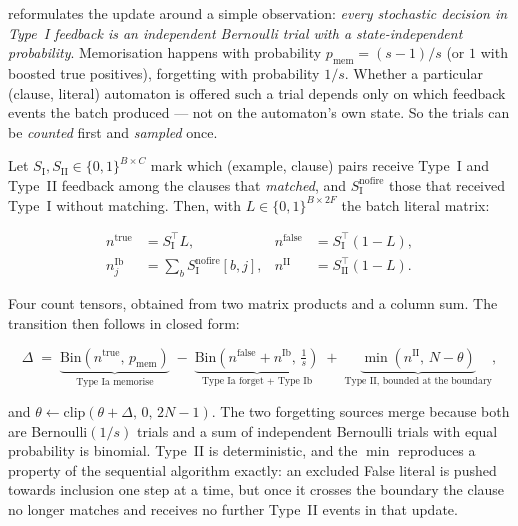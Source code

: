\ttlibname reformulates the update around a simple observation: \emph{every stochastic
decision in Type~I feedback is an independent Bernoulli trial with a state-independent
probability}. Memorisation happens with probability $p_{\text{mem}} = (s-1)/s$ (or $1$ with
boosted true positives), forgetting with probability $1/s$. Whether a particular
(clause, literal) automaton is offered such a trial depends only on which feedback events the
batch produced --- not on the automaton's own state. So the trials can be \emph{counted}
first and \emph{sampled} once.

Let $S_{\mathrm{I}}, S_{\mathrm{II}} \in \{0,1\}^{B\times C}$ mark which (example, clause)
pairs receive Type~I and Type~II feedback among the clauses that \emph{matched}, and
$S_{\mathrm{I}}^{\text{nofire}}$ those that received Type~I without matching. Then, with
$L \in \{0,1\}^{B\times 2F}$ the batch literal matrix:

\begin{align}
  n^{\text{true}} &= S_{\mathrm{I}}^{\!\top} L, &
  n^{\text{false}} &= S_{\mathrm{I}}^{\!\top} (1 - L), \\
  n^{\text{Ib}}_j &= \textstyle\sum_b S^{\text{nofire}}_{\mathrm{I}}[b,j], &
  n^{\text{II}} &= S_{\mathrm{II}}^{\!\top} (1 - L).
\end{align}

Four count tensors, obtained from two matrix products and a column sum. The transition then
follows in closed form:

\begin{equation}
  \Delta \;=\; \underbrace{\mathrm{Bin}\!\left(n^{\text{true}},\, p_{\text{mem}}\right)}_{\text{Type Ia memorise}}
  \;-\; \underbrace{\mathrm{Bin}\!\left(n^{\text{false}} + n^{\text{Ib}},\, \tfrac{1}{s}\right)}_{\text{Type Ia forget } + \text{ Type Ib}}
  \;+\; \underbrace{\min\!\left(n^{\text{II}},\, N - \theta\right)}_{\text{Type II, bounded at the boundary}},
  \label{eq:delta}
\end{equation}

and $\theta \leftarrow \mathrm{clip}(\theta + \Delta,\, 0,\, 2N-1)$. The two forgetting
sources merge because both are Bernoulli$(1/s)$ trials and a sum of independent Bernoulli
trials with equal probability is binomial. Type~II is deterministic, and the $\min$ reproduces
a property of the sequential algorithm exactly: an excluded False literal is pushed towards
inclusion one step at a time, but once it crosses the boundary the clause no longer matches
and receives no further Type~II events in that update.

